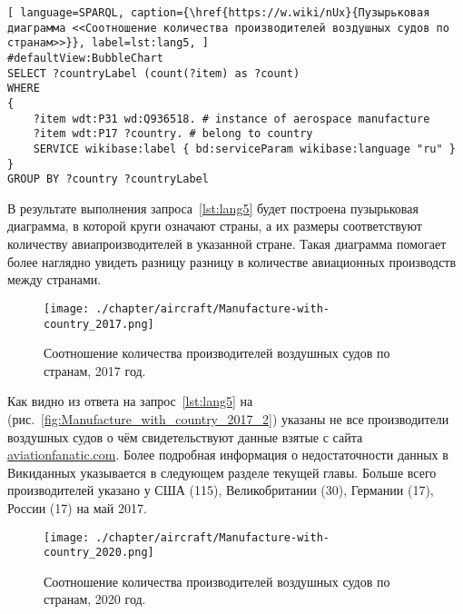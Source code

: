 \begin{lstlisting}[ language=SPARQL, caption={\href{https://w.wiki/nUx}{Пузырьковая диаграмма <<Соотношение количества производителей воздушных судов по странам>>}}, label=lst:lang5, ]
#defaultView:BubbleChart
SELECT ?countryLabel (count(?item) as ?count)
WHERE
{
    ?item wdt:P31 wd:Q936518. # instance of aerospace manufacture
  	?item wdt:P17 ?country. # belong to country
    SERVICE wikibase:label { bd:serviceParam wikibase:language "ru" }
}
GROUP BY ?country ?countryLabel
\end{lstlisting}

В результате выполнения запроса~\ref{lst:lang5} будет построена пузырьковая диаграмма, в которой круги означают страны, а их размеры соответствуют количеству авиапроизводителей в указанной стране. Такая диаграмма помогает более наглядно увидеть разницу разницу в количестве авиационных производств между странами.
 
\begin{figure}[h!]
\centering
	\texttt{[image: ./chapter/aircraft/Manufacture-with-country\_2017.png]}
	\caption{Соотношение количества производителей воздушных судов по странам, 2017 год.}
	\label{fig:Manufacture_with_country_2017}
\end{figure}

Как видно из ответа на запрос~\ref{lst:lang5} на (рис.~\ref{fig:Manufacture_with_country_2017_2}) указаны не все производители воздушных судов о чём свидетельствуют данные взятые с сайта \href{https://www.aviationfanatic.com/}{aviationfanatic.com}. Более подробная информация о недостаточности данных в Викиданных указывается в следующем разделе текущей главы. Больше всего производителей указано у США (115), Великобритании (30), Германии (17), России (17) на май 2017.

\begin{figure}[h!]
\centering
	\texttt{[image: ./chapter/aircraft/Manufacture-with-country\_2020.png]}
	\caption{Соотношение количества производителей воздушных судов по странам, 2020 год.}
	\label{fig:Manufacture_with_country_2020}
\end{figure}

\label{fig:Manufacture_with_country_2017_2}

